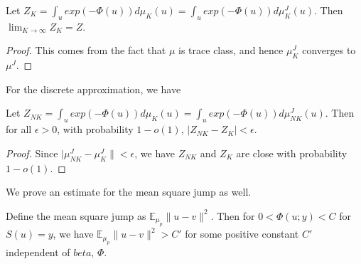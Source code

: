 \documentclass[final]{siamart0516}
\newcommand{\bbE}{\mathbb{E}}
\begin{document}
\begin{proposition}
Let $Z_K = \int_{u} exp(-\Phi(u)) d\mu_K(u) = \int_{u} exp(-\Phi(u)) d\mu_K^J(u)$. Then $\lim_{K\rightarrow \infty} Z_K = Z$. 
\end{proposition}
\begin{proof}
This comes from the fact that $\mu$ is trace class, and hence $\mu_K^J$ converges to $\mu^J$. 
\end{proof}
For the discrete approximation, we have 
\begin{proposition}
Let $Z_{NK} = \int_{u} exp(-\Phi(u)) d\mu_K(u) = \int_{u} exp(-\Phi(u)) d\mu_{NK}^J(u)$. Then for all $\epsilon > 0$, with probability $1 - o(1)$, $|Z_{NK} - Z_K| < \epsilon$. 
\end{proposition}
\begin{proof}
Since $|\mu_{NK}^J - \mu_{K}^J\| < \epsilon$, we have $Z_{NK}$ and $Z_K$ are close with probability $1 - o(1)$. 
\end{proof}

We prove an estimate for the mean square jump as well. 
\begin{proposition}
Define the mean square jump as $\bbE_{\mu_p} \|u - v\|^2$. Then for $0 < \Phi(u; y) < C$ for $S(u) = y$, we have  $\bbE_{\mu_p} \|u - v\|^2 > C'$ for some positive constant $C'$ independent of $beta$, $\Phi$. 
\end{proposition}
\end{document}

